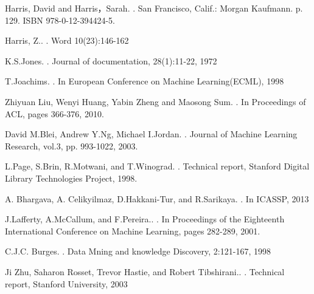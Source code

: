 \documentclass[master]{njuthesis}
\begin{document}
%

\begin{thebibliography}{2}

{Harris, David and Harris，Sarah}.
.
\newblock San Francisco, Calif.: Morgan Kaufmann. p. 129. ISBN 978-0-12-394424-5.

{Harris, Z.}.
.
\newblock Word 10(23):146-162

{K.S.Jones}.
.
\newblock Journal of documentation, 28(1):11-22, 1972

{T.Joachims}.
.
\newblock In European Conference on Machine Learning(ECML), 1998


{Zhiyuan Liu, Wenyi Huang, Yabin Zheng and Maosong Sum}.
.
\newblock In Proceedings of ACL, pages 366-376, 2010.

{David M.Blei, Andrew Y.Ng, Michael I.Jordan}.
.
\newblock Journal of Machine Learning Research, vol.3, pp. 993-1022, 2003.

{L.Page, S.Brin, R.Motwani, and T.Winograd}.
.
\newblock Technical report, Stanford Digital Library Technologies Project, 1998.

{A. Bhargava, A. Celikyilmaz, D.Hakkani-Tur, and R.Sarikaya}.
.
\newblock In ICASSP, 2013

{J.Lafferty, A.McCallum, and F.Pereira.}.
.
\newblock In Proceedings of the Eighteenth International Conference on Machine Learning, pages 282-289, 2001.

{C.J.C. Burges}.
.
\newblock Data Mning and knowledge Discovery, 2:121-167, 1998

{Ji Zhu, Saharon Rosset, Trevor Hastie, and Robert Tibshirani.}.
.
\newblock Technical report, Stanford University, 2003


\end{thebibliography}
\end{document}
